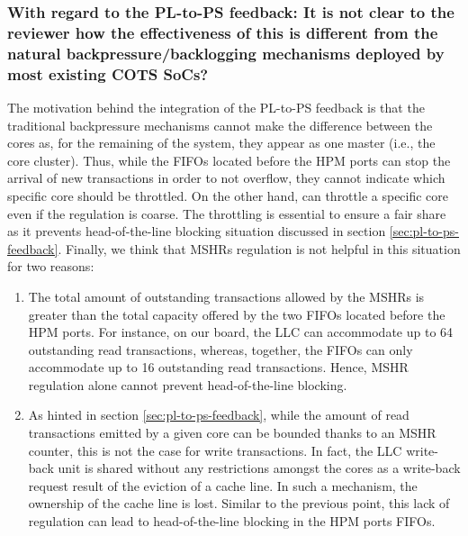         \subsubsection{With regard to the PL-to-PS feedback: It is not clear to the reviewer how the effectiveness of this is different from the natural backpressure/backlogging mechanisms deployed by most existing COTS SoCs?}
            The motivation behind the integration of the PL-to-PS feedback is that the traditional backpressure mechanisms cannot make the difference between the cores as, for the remaining of the system, they appear as one master (i.e., the core cluster).
            Thus, while the FIFOs located before the HPM ports can stop the arrival of new transactions in order to not overflow, they cannot indicate which specific core should be throttled. On the other hand, \schim can throttle a specific core even if the regulation is coarse.
            The throttling is essential to ensure a fair share as it prevents head-of-the-line blocking situation discussed in section \ref{sec:pl-to-ps-feedback}.
            Finally, we think that MSHRs regulation is not helpful in this situation for two reasons:
            \begin{enumerate}
                \item The total amount of outstanding transactions allowed by the MSHRs is greater than the total capacity offered by the two FIFOs located before the HPM ports. For instance, on our board, the LLC can accommodate up to 64 outstanding read transactions, whereas, together, the FIFOs can only accommodate up to 16 outstanding read transactions. Hence, MSHR regulation alone cannot prevent head-of-the-line blocking.
                \item As hinted in section \ref{sec:pl-to-ps-feedback}, while the amount of read transactions emitted by a given core can be bounded thanks to an MSHR counter, this is not the case for write transactions. In fact, the LLC write-back unit is shared without any restrictions amongst the cores as a write-back request result of the eviction of a cache line. In such a mechanism, the ownership of the cache line is lost. Similar to the previous point, this lack of regulation can lead to head-of-the-line blocking in the HPM ports FIFOs.
            \end{enumerate}

